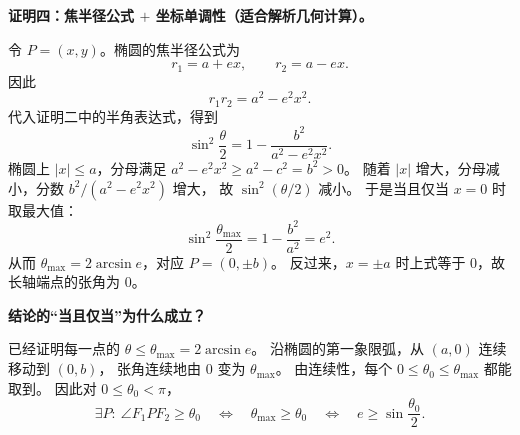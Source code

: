 \begin{proofbox}
\medskip
\textbf{证明四：焦半径公式 $+$ 坐标单调性（适合解析几何计算）。}

令 $P=(x,y)$。椭圆的焦半径公式为
\[
r_1=a+ex,\qquad r_2=a-ex.
\]
因此
\[
r_1r_2=a^2-e^2x^2.
\]
代入证明二中的半角表达式，得到
\[
\boxed{
\sin^2\frac\theta2
=1-\frac{b^2}{a^2-e^2x^2}.
}
\]
椭圆上 $|x|\le a$，分母满足
$ a^2-e^2x^2\ge a^2-c^2=b^2>0$。
随着 $|x|$ 增大，分母减小，分数 $b^2/(a^2-e^2x^2)$ 增大，
故 $\sin^2(\theta/2)$ 减小。
于是当且仅当 $x=0$ 时取最大值：
\[
\sin^2\frac{\theta_{\max}}2
=1-\frac{b^2}{a^2}=e^2.
\]
从而 $\theta_{\max}=2\arcsin e$，对应 $P=(0,\pm b)$。
反过来，$x=\pm a$ 时上式等于 $0$，故长轴端点的张角为 $0$。

\medskip
\textbf{结论的“当且仅当”为什么成立？}

已经证明每一点的 $\theta\le\theta_{\max}=2\arcsin e$。
沿椭圆的第一象限弧，从 $(a,0)$ 连续移动到 $(0,b)$，
张角连续地由 $0$ 变为 $\theta_{\max}$。
由连续性，每个 $0\le\theta_0\le\theta_{\max}$ 都能取到。
因此对 $0\le\theta_0<\pi$，
\[
\exists P:\ \angle F_1PF_2\ge\theta_0
\quad\Longleftrightarrow\quad
\theta_{\max}\ge\theta_0
\quad\Longleftrightarrow\quad
 e\ge\sin\frac{\theta_0}{2}.
\]
\end{proofbox}
